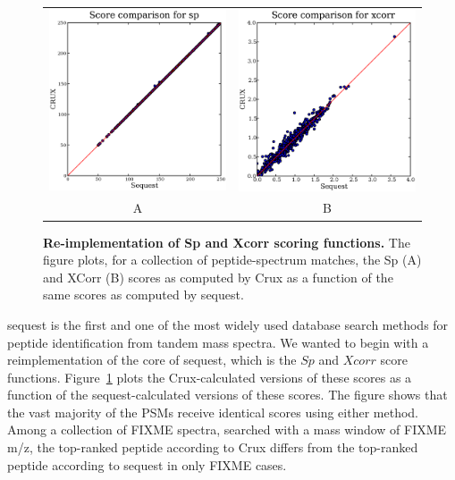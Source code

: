 \documentclass[12pt]{article}
\begin{document}
\begin{figure}
  \centering
  \begin{tabular}{cc}
    \includegraphics[width=3in]{./Images/random-sp.eps} &
    \includegraphics[width=3in]{./Images/random-xcorr.eps} \\
  A & B \\
  \end{tabular}
  \caption{{\bf Re-implementation of Sp and Xcorr scoring functions.}
  The figure plots, for a collection of peptide-spectrum matches, the
  Sp (A) and XCorr (B) scores as computed by Crux as a function of the
  same scores as computed by {\sc sequest}.
  \label{figure:sp-xcorr}}
\end{figure}

{\sc sequest} is the first and one of the most widely used database search
methods for peptide identification from tandem mass spectra.  We
wanted to begin with a reimplementation of the core of {\sc sequest}, which
is the $Sp$ and $Xcorr$ score functions.  Figure~\ref{figure:sp-xcorr}
plots the Crux-calculated versions of these scores as a function of
the {\sc sequest}-calculated versions of these scores.  The figure shows
that the vast majority of the PSMs receive identical scores using
either method.  Among a collection of FIXME spectra, searched with a
mass window of FIXME m/z, the top-ranked peptide according to Crux
differs from the top-ranked peptide according to {\sc sequest} in only FIXME
cases.  
\end{document}

